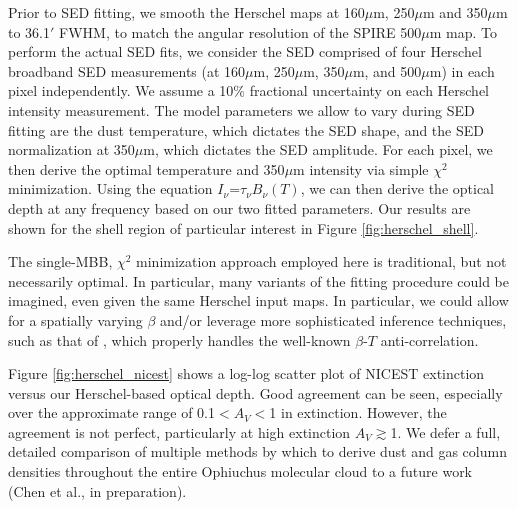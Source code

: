 \documentclass[11pt,a4paper]{emulateapj}
\begin{document}
Prior to SED fitting, we smooth the Herschel maps at 160$\mu$m, 250$\mu$m and 350$\mu$m to 36.1$'$ FWHM, to match the angular resolution of the SPIRE 500$\mu$m map. To perform the actual SED fits, we consider the SED comprised of four Herschel broadband SED measurements (at 160$\mu$m, 250$\mu$m, 350$\mu$m, and 500$\mu$m) in each pixel independently. We assume a 10\% fractional uncertainty on each Herschel intensity measurement. The model parameters we allow to vary during SED fitting are the dust temperature, which dictates the SED shape, and the SED normalization at 350$\mu$m, which dictates the SED amplitude. For each pixel, we then derive the optimal temperature and 350$\mu$m intensity via simple $\chi^2$ minimization. Using the equation $I_{\nu}$=$\tau_{\nu}$$B_{\nu}(T)$, we can then derive the optical depth at any frequency based on our two fitted parameters. Our results are shown for the shell region of particular interest in Figure \ref{fig:herschel_shell}.

The single-MBB, $\chi^2$ minimization approach employed here is traditional, but not necessarily optimal. In particular, many variants of the fitting procedure could be imagined, even given the same Herschel input maps. In particular, we could allow for a spatially varying $\beta$ and/or leverage more sophisticated inference techniques, such as that of \cite{Kelly_2012}, which properly handles the well-known $\beta$-$T$ anti-correlation. 

Figure \ref{fig:herschel_nicest} shows a log-log scatter plot of NICEST extinction versus our Herschel-based optical depth. Good agreement can be seen, especially over the
approximate range of 0.1$<$$A_V$$<$1 in extinction. However, the agreement is not perfect, particularly at high extinction $A_V$$\gtrsim$1. We defer a full, detailed comparison of multiple methods by which to derive dust and gas column densities throughout the entire Ophiuchus molecular cloud to a future work (Chen et al., in preparation).
\end{document}
